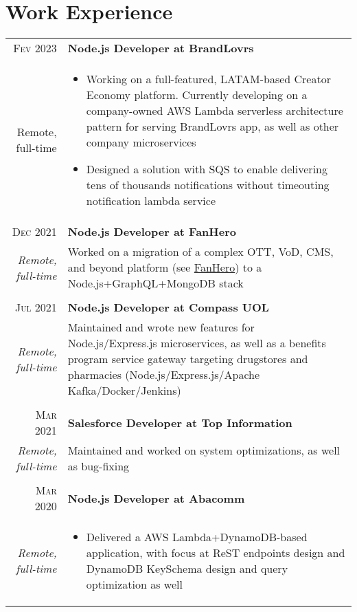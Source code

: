 \documentclass[a4paper,10pt]{article}
\begin{document}
\section{Work Experience}
\begin{supertabular}{r|p{11cm}}
\textsc{Fev 2023} & \textbf{Node.js Developer at BrandLovrs}\\
\footnotesize{Remote, full-time}
  &\begin{itemize}
    \item \footnotesize{Working on a full-featured, LATAM-based Creator Economy platform. Currently developing on a company-owned AWS Lambda serverless architecture pattern for serving BrandLovrs app, as well as other company microservices}
    \item \footnotesize{Designed a solution with SQS to enable delivering tens of thousands notifications without timeouting notification lambda service}
  \end{itemize}\\
\textsc{Dec 2021} & \textbf{Node.js Developer at FanHero}\\
\footnotesize{\textit{Remote, full-time}}
  & \footnotesize{Worked on a migration of a complex OTT, VoD, CMS, and beyond platform (see \href{https://fanhero.com}{FanHero}) to a Node.js+GraphQL+MongoDB stack}\\\\
\textsc{Jul 2021} & \textbf{Node.js Developer at Compass UOL}\\
\footnotesize{\textit{Remote, full-time}}
   & \footnotesize{Maintained and wrote new features for Node.js/Express.js microservices, as well as a benefits program service gateway targeting drugstores and pharmacies (Node.js/Express.js/Apache Kafka/Docker/Jenkins)}\\\\
\textsc{Mar 2021} & \textbf{Salesforce Developer at Top Information}\\
\footnotesize{\textit{Remote, full-time}}
 & \footnotesize{Maintained and worked on system optimizations, as well as bug-fixing}\\\\
\textsc{Mar 2020} & \textbf{Node.js Developer at Abacomm}\\
\footnotesize{\textit{Remote, full-time}}
  &\begin{itemize}
    \item \footnotesize{Delivered a AWS Lambda+DynamoDB-based application, with focus at ReST endpoints design and DynamoDB KeySchema design and query optimization as well}

\end{itemize}
\end{supertabular}
\end{document}
